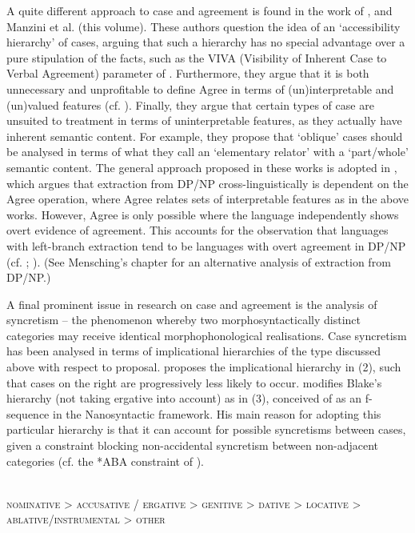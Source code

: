 \documentclass[output=paper]{langsci/langscibook}
\begin{document}
A quite different approach to case and agreement is found in the work of \citet{Manzini2016}, \citet{Franco2017} and Manzini et al. (this volume). These authors question the idea of an ‘accessibility hierarchy’ of cases, arguing that such a hierarchy has no special advantage over a pure stipulation of the facts, such as the VIVA (Visibility of Inherent Case to Verbal Agreement) parameter of \citet{Anand2006}. Furthermore, they argue that it is both unnecessary and unprofitable to define Agree in terms of (un)interpretable and (un)valued features (cf. \citealt{Brody1997}). Finally, they argue that certain types of case are unsuited to treatment in terms of uninterpretable features, as they actually have inherent semantic content. For example, they propose that ‘oblique’ cases should be analysed in terms of what they call an ‘elementary relator’ with a ‘part/whole’ semantic content. The general approach proposed in these works is adopted in \citet{Reeve2018}, which argues that extraction from DP/NP cross-linguistically is dependent on the Agree operation, where Agree relates sets of interpretable features as in the above works. However, Agree is only possible where the language independently shows overt evidence of agreement. This accounts for the observation that languages with left-branch extraction tend to be languages with overt agreement in DP/NP (cf. \citealt[237--238]{Ross1967}; \citealt[188]{Horn1983}). (See Mensching’s chapter for an alternative analysis of extraction from DP/NP.)

A final prominent issue in research on case and agreement is the analysis of syncretism – the phenomenon whereby two morphosyntactically distinct categories may receive identical morphophonological realisations. Case syncretism has been analysed in terms of implicational hierarchies of the type discussed above with respect to  proposal. \citet{Blake2001} proposes the implicational hierarchy in (2), such that cases on the right are progressively less likely to occur. \citet{Caha2009} modifies Blake’s hierarchy (not taking ergative into account) as in (3), conceived of as an f-sequence in the Nanosyntactic framework. His main reason for adopting this particular hierarchy is that it can account for possible syncretisms between cases, given a constraint blocking non-accidental syncretism between non-adjacent categories (cf. the *ABA constraint of \citealt{Bobaljik2012}).

\ea%
\label{ex:intro:2}\citep[156]{Blake2001}\\
\textsc{nominative > accusative / ergative > genitive > dative > locative > ablative/instrumental > other}    
 \z
\end{document}
